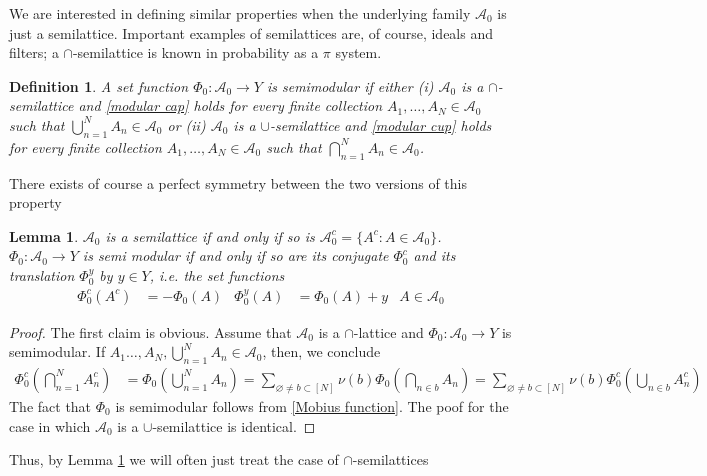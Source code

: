 \documentclass[11pt]{amsart}
\theoremstyle{plain}
\newtheorem{definition}{Definition}
\newtheorem{lemma}{Lemma}
\begin{document}
We are interested in defining similar properties when the underlying family ${\mathscr{A}}_0$ 
is just a semilattice. Important examples of semilattices are, of course, ideals 
and filters; a $\cap$-semilattice is known in probability as a $\pi$ system. 

\begin{definition}
A set function $\Phi_0:{\mathscr{A}}_0\to Y$ is semimodular if either (\textit{i}) ${\mathscr{A}}_0$ is a 
$\cap$-semilattice and \eqref{modular cap} holds for every finite collection 
$A_1,\ldots,A_N\in{\mathscr{A}}_0$ such that $\bigcup_{n=1}^NA_n\in{\mathscr{A}}_0$ or (\textit{ii}) 
${\mathscr{A}}_0$ is a $\cup$-semilattice and \eqref{modular cup} holds for every finite 
collection $A_1,\ldots,A_N\in{\mathscr{A}}_0$ such that $\bigcap_{n=1}^NA_n\in{\mathscr{A}}_0$. 
\end{definition}

There exists of course a perfect symmetry between the two versions
of this property 

\begin{lemma}
\label{lemma conjugate}
${\mathscr{A}}_0$ is a semilattice if and only if so is ${\mathscr{A}}_0^c=\{A^c:A\in{\mathscr{A}}_0\}$. 
$\Phi_0:{\mathscr{A}}_0\to Y$ is semi modular if and only if so are its conjugate $\Phi_0^c$
and its translation $\Phi_0^y$ by $y\in Y$, i.e. the set functions 
\begin{align}
\label{conjugate} 
\Phi_0^c(A^c)&=-\Phi_0(A)&\Phi_0^y(A)&=\Phi_0(A)+y& A\in{\mathscr{A}}_0 
\end{align}
\end{lemma} 
\begin{proof} 
The first claim is obvious. Assume that ${\mathscr{A}}_0$ is a $\cap$-lattice and 
$\Phi_0:{\mathscr{A}}_0\to Y$ is semimodular. If $A_1\ldots,A_N,\bigcup_{n=1}^NA_n\in{\mathscr{A}}_0$, 
then, we conclude
\begin{align*}
\Phi^c_0\left(\bigcap_{n=1}^NA^c_n\right)
&=
\Phi_0\left(\bigcup_{n=1}^NA_n\right)
=
\sum_{{\varnothing}\ne b\subset[N]}\nu(b)\Phi_0\left(\bigcap_{n\in b}A_n\right)
=
\sum_{{\varnothing}\ne b\subset[N]}\nu(b)\Phi^c_0\left(\bigcup_{n\in b}A^c_n\right)
\end{align*} 
The fact that $\Phi_0$ is semimodular follows from \eqref{Mobius function}.
The poof for the case in which ${\mathscr{A}}_0$ is a $\cup$-semilattice is identical.
\end{proof}

Thus, by Lemma \ref{lemma conjugate} we will often just treat the case of
$\cap$-semilattices
\end{document}
